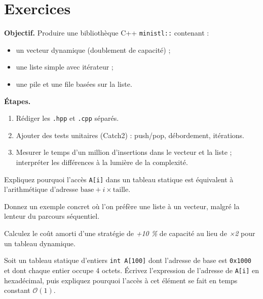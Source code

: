 \section*{Exercices}
\begin{tp}
\textbf{Objectif.}  Produire une bibliothèque C++ \lstinline|ministl::|
contenant :
\begin{itemize}
  \item un vecteur dynamique (doublement de capacité) ;
  \item une liste simple avec itérateur ;
  \item une pile et une file basées sur la liste.
\end{itemize}
\textbf{Étapes.}
\begin{enumerate}
  \item Rédiger les \lstinline|.hpp| et \lstinline|.cpp| séparés.
  \item Ajouter des tests unitaires (Catch2) : push/pop, débordement, itérations.
  \item Mesurer le temps d’un million d’insertions dans le vecteur et la liste ;
        interpréter les différences à la lumière de la complexité.
\end{enumerate}
\end{tp}


\begin{exercice}
Expliquez pourquoi l’accès \lstinline|A[i]| dans un tableau statique
est équivalent à l’arithmétique d’adresse \(\text{base}+i\times\text{taille}\).
\end{exercice}

\begin{exercice}
Donnez un exemple concret où l’on préfère une liste à un vecteur,
malgré la lenteur du parcours séquentiel.
\end{exercice}

\begin{exercice}
Calculez le coût amorti d’une stratégie de \emph{+10 \%} de capacité
au lieu de \emph{×2} pour un tableau dynamique.
\end{exercice}



\begin{exercice}
Soit un tableau statique d’entiers \lstinline|int A[100]| dont l’adresse de base
est \lstinline|0x1000| et dont chaque entier occupe 4 octets.
Écrivez l’expression de l’adresse de \lstinline|A[i]| en hexadécimal, puis
expliquez pourquoi l’accès à cet élément se fait en temps constant
\(\mathcal{O}(1)\).
\end{exercice}

